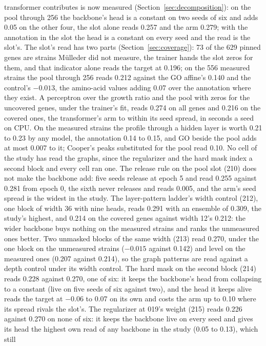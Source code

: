transformer contributes is now measured (Section~\ref{sec:decomposition}): on the
pool through 256 the backbone's head is a constant on two seeds of six and adds 0.05
on the other four, the slot alone reads 0.257 and the arm 0.279; with the annotation
in the slot the head is a constant on every seed and the read is the slot's. The
slot's read has two parts (Section~\ref{sec:coverage}): 73 of the 629 pinned genes are
strains M\"ulleder did not measure, the trainer hands the slot zeros for them, and that
indicator alone reads the target at 0.196; on the 556 measured strains the pool through
256 reads 0.212 against the GO affine's 0.140 and the control's $-0.013$, the
amino-acid values adding 0.07 over the annotation where they exist. A perceptron over
the growth ratio and the pool with zeros for the uncovered genes, under the trainer's
fit, reads 0.274 on all genes and 0.216 on the covered ones, the transformer's arm to
within its seed spread, in seconds a seed on CPU. On the measured strains the profile
through a hidden layer is worth 0.21 to 0.23 by any model, the annotation 0.14 to 0.15,
and GO beside the pool adds at most 0.007 to it; Cooper's peaks substituted for the
pool read 0.10. No cell
of the study has read the graphs, since the regularizer and the hard mask index a
second block and every cell ran one. The release rule on the pool slot (210) does not
make the backbone add: five seeds release at epoch 5 and read 0.255 against 0.281 from
epoch 0, the sixth never releases and reads 0.005, and the arm's seed spread is the
widest in the study. The layer-pattern ladder's width control (212), one block of width
36 with nine heads, reads 0.291 with an ensemble of 0.309, the study's highest, and
0.214 on the covered genes against width 12's 0.212: the wider backbone buys nothing on
the measured strains and ranks the unmeasured ones better. Two unmasked blocks of the
same width (213) read 0.270, under the one block on the unmeasured strains ($-0.015$
against 0.142) and level on the measured ones (0.207 against 0.214), so the graph
patterns are read against a depth control under its width control. The hard mask on
the second block (214) reads 0.228 against 0.270, one of six: it keeps the backbone's
head from collapsing to a constant (live on five seeds of six against two), and the
head it keeps alive reads the target at $-0.06$ to 0.07 on its own and costs the arm up
to 0.10 where its spread rivals the slot's. The regularizer at 019's weight (215) reads
0.226 against 0.270 on none of six: it keeps the backbone live on every seed and gives
its head the highest own read of any backbone in the study (0.05 to 0.13), which still
